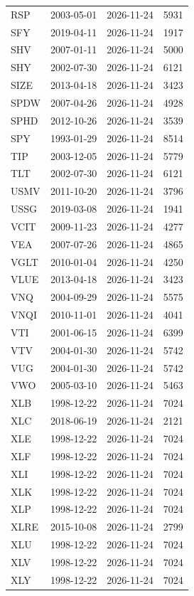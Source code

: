\begin{tabularx}{\textwidth}{@{}P{0.62in}P{0.92in}P{0.92in}Y@{}}
RSP & 2003-05-01 & 2026-11-24 & 5931 \\
SFY & 2019-04-11 & 2026-11-24 & 1917 \\
SHV & 2007-01-11 & 2026-11-24 & 5000 \\
SHY & 2002-07-30 & 2026-11-24 & 6121 \\
SIZE & 2013-04-18 & 2026-11-24 & 3423 \\
SPDW & 2007-04-26 & 2026-11-24 & 4928 \\
SPHD & 2012-10-26 & 2026-11-24 & 3539 \\
SPY & 1993-01-29 & 2026-11-24 & 8514 \\
TIP & 2003-12-05 & 2026-11-24 & 5779 \\
TLT & 2002-07-30 & 2026-11-24 & 6121 \\
USMV & 2011-10-20 & 2026-11-24 & 3796 \\
USSG & 2019-03-08 & 2026-11-24 & 1941 \\
VCIT & 2009-11-23 & 2026-11-24 & 4277 \\
VEA & 2007-07-26 & 2026-11-24 & 4865 \\
VGLT & 2010-01-04 & 2026-11-24 & 4250 \\
VLUE & 2013-04-18 & 2026-11-24 & 3423 \\
VNQ & 2004-09-29 & 2026-11-24 & 5575 \\
VNQI & 2010-11-01 & 2026-11-24 & 4041 \\
VTI & 2001-06-15 & 2026-11-24 & 6399 \\
VTV & 2004-01-30 & 2026-11-24 & 5742 \\
VUG & 2004-01-30 & 2026-11-24 & 5742 \\
VWO & 2005-03-10 & 2026-11-24 & 5463 \\
XLB & 1998-12-22 & 2026-11-24 & 7024 \\
XLC & 2018-06-19 & 2026-11-24 & 2121 \\
XLE & 1998-12-22 & 2026-11-24 & 7024 \\
XLF & 1998-12-22 & 2026-11-24 & 7024 \\
XLI & 1998-12-22 & 2026-11-24 & 7024 \\
XLK & 1998-12-22 & 2026-11-24 & 7024 \\
XLP & 1998-12-22 & 2026-11-24 & 7024 \\
XLRE & 2015-10-08 & 2026-11-24 & 2799 \\
XLU & 1998-12-22 & 2026-11-24 & 7024 \\
XLV & 1998-12-22 & 2026-11-24 & 7024 \\
XLY & 1998-12-22 & 2026-11-24 & 7024 \\
\bottomrule
\end{tabularx}
